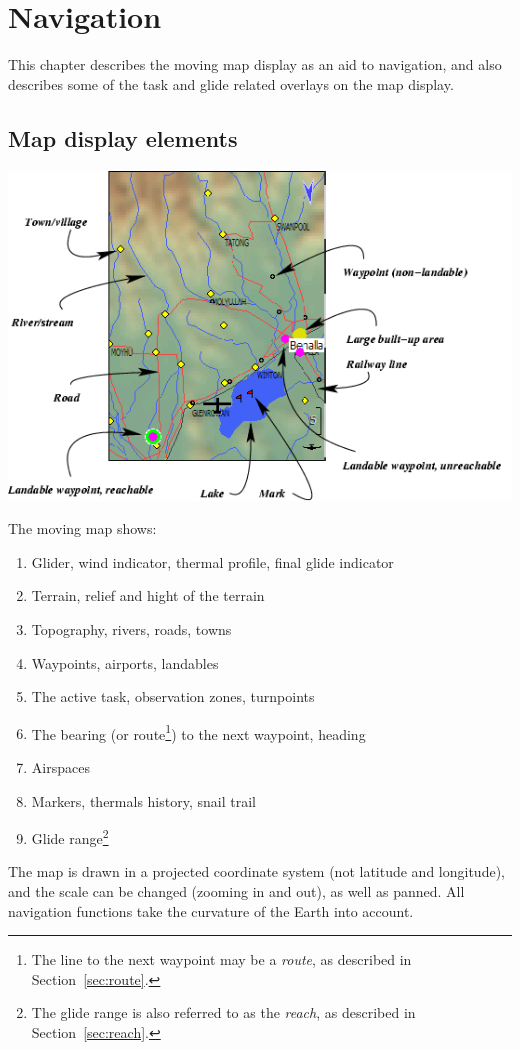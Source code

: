 \chapter{Navigation}\label{cha:navigation}
This chapter describes the moving map display as an aid to navigation,
and also describes some of the task and glide related overlays on the
map display.

\section{Map display elements}

\begin{maxipage}
\includegraphics[angle=0,width=0.9\linewidth,keepaspectratio='true']{figures/fig-map.png}
\end{maxipage}

The moving map shows:
\begin{enumerate} 
\item Glider, wind indicator, thermal profile, final glide indicator
\item Terrain, relief and hight of the terrain
\item Topography, rivers, roads, towns
\item Waypoints, airports, landables
\item The active task, observation zones, turnpoints
\item The bearing (or route\footnote{The line to the next waypoint may be a 
  \emph{route}, as described in Section~\ref{sec:route}.}) to the next waypoint, 
  heading
\item Airspaces
\item Markers, thermals history, snail trail
\item Glide range\footnote{The glide range is also referred to as the 
  \emph{reach}, as described in Section~\ref{sec:reach}.}
\end{enumerate}
The map is drawn in a projected coordinate system (not latitude and
longitude), and the scale can be changed (zooming in and out), as well
as panned.  All navigation functions take the curvature of the Earth
into account.

